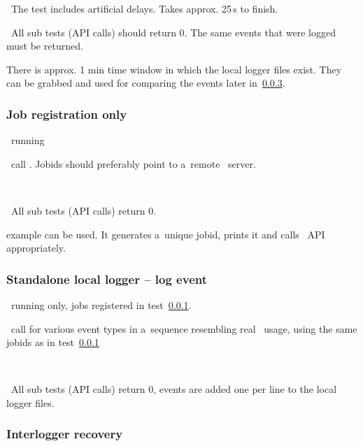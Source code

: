 \note\ The test includes artificial delays. Takes approx. 25\,s to finish.

\result\ All sub tests (API calls) should return 0. The same events that were logged must be returned.

\begin{hints}
There is approx. 1 min time window in which the local logger files exist.
They can be grabbed and used for comparing the events later in~\ref{recover}.
\end{hints}



\subsubsection{Job registration only}
\label{reg}
\req\ running 

\what\ call . Jobids should preferably point
to a~remote \LB\ server.

\how\ 

\result\ All sub tests (API calls) return 0.

\begin{hints}
 example can be used. It generates a~unique jobid,
prints it and calls \LB\ API appropriately.
\end{hints}



\subsubsection{Standalone local logger -- log event}
\label{log}

\req\ running  only, jobs registered in test~\ref{reg}.

\what\ call  for various event types in a~sequence
resembling real \LB\ usage, using the same jobids as in test~\ref{reg}

\how\ 

\result\ All sub tests (API calls) return 0, events are added one per line to the local logger files.



\subsubsection{Interlogger recovery}
\label{recover}

